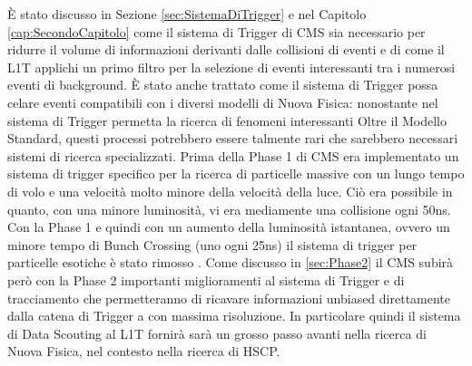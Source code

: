 È stato discusso in Sezione \ref{sec:SistemaDiTrigger} e nel Capitolo \ref{cap:SecondoCapitolo} come il sistema di Trigger di CMS sia necessario per ridurre il volume di informazioni derivanti dalle collisioni di eventi e di come il L1T applichi un primo filtro per la selezione di eventi interessanti tra i numerosi eventi di background. È stato anche trattato come il sistema di Trigger possa celare eventi compatibili con i diversi modelli di Nuova Fisica: nonostante nel sistema di Trigger permetta la ricerca di fenomeni interessanti Oltre il Modello Standard, questi processi potrebbero essere talmente rari che sarebbero necessari sistemi di ricerca specializzati.\newline
Prima della Phase 1 di CMS era implementato un sistema di trigger specifico per la ricerca di particelle massive con un lungo tempo di volo e una velocità molto minore della velocità della luce. Ciò era possibile in quanto, con una minore luminosità, vi era mediamente una collisione ogni 50ns. Con la Phase 1 e quindi con un aumento della luminosità istantanea, ovvero un minore tempo di Bunch Crossing (uno ogni 25ns) il sistema di trigger per particelle esotiche è stato rimosso \cite{MasterThesisGioMoc}.\newline
Come discusso in \ref{sec:Phase2} il CMS subirà però con la Phase 2 importanti miglioramenti al sistema di Trigger e di tracciamento che permetteranno di ricavare informazioni unbiased direttamente dalla catena di Trigger a con massima risoluzione. In particolare quindi il sistema di Data Scouting al L1T fornirà sarà un grosso passo avanti nella ricerca di Nuova Fisica, nel contesto nella ricerca di HSCP. \newline








